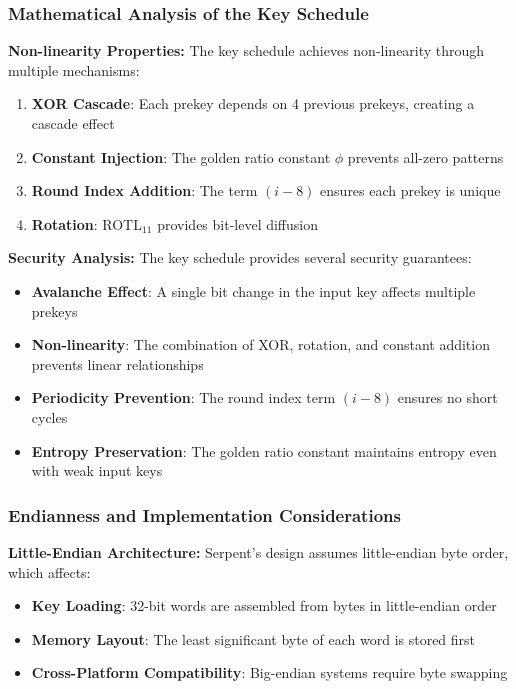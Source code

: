 \documentclass[12pt,a4paper]{article}
\begin{document}
\subsubsection{Mathematical Analysis of the Key Schedule}

\textbf{Non-linearity Properties:}
The key schedule achieves non-linearity through multiple mechanisms:

\begin{enumerate}
    \item \textbf{XOR Cascade}: Each prekey depends on 4 previous prekeys, creating a cascade effect
    \item \textbf{Constant Injection}: The golden ratio constant $\phi$ prevents all-zero patterns
    \item \textbf{Round Index Addition}: The term $(i-8)$ ensures each prekey is unique
    \item \textbf{Rotation}: ROTL$_{11}$ provides bit-level diffusion
\end{enumerate}

\textbf{Security Analysis:}
The key schedule provides several security guarantees:

\begin{itemize}
    \item \textbf{Avalanche Effect}: A single bit change in the input key affects multiple prekeys
    \item \textbf{Non-linearity}: The combination of XOR, rotation, and constant addition prevents linear relationships
    \item \textbf{Periodicity Prevention}: The round index term $(i-8)$ ensures no short cycles
    \item \textbf{Entropy Preservation}: The golden ratio constant maintains entropy even with weak input keys
\end{itemize}

\subsubsection{Endianness and Implementation Considerations}

\textbf{Little-Endian Architecture:}
Serpent's design assumes little-endian byte order, which affects:

\begin{itemize}
    \item \textbf{Key Loading}: 32-bit words are assembled from bytes in little-endian order
    \item \textbf{Memory Layout}: The least significant byte of each word is stored first
    \item \textbf{Cross-Platform Compatibility}: Big-endian systems require byte swapping
\end{itemize}
\end{document}
